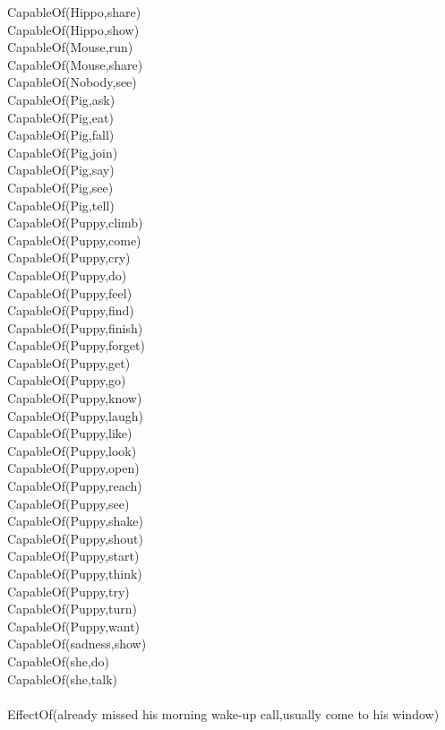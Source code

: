 \begin{multicols}{2}
\begin{footnotesize}
CapableOf(Hippo,share) \\
CapableOf(Hippo,show) \\
CapableOf(Mouse,run) \\
CapableOf(Mouse,share) \\
CapableOf(Nobody,see) \\
CapableOf(Pig,ask) \\
CapableOf(Pig,eat) \\
CapableOf(Pig,fall) \\
CapableOf(Pig,join) \\
CapableOf(Pig,say) \\
CapableOf(Pig,see) \\
CapableOf(Pig,tell) \\
CapableOf(Puppy,climb) \\
CapableOf(Puppy,come) \\
CapableOf(Puppy,cry) \\
CapableOf(Puppy,do) \\
CapableOf(Puppy,feel) \\
CapableOf(Puppy,find) \\
CapableOf(Puppy,finish) \\
CapableOf(Puppy,forget) \\
CapableOf(Puppy,get) \\
CapableOf(Puppy,go) \\
CapableOf(Puppy,know) \\
CapableOf(Puppy,laugh) \\
CapableOf(Puppy,like) \\
CapableOf(Puppy,look) \\
CapableOf(Puppy,open) \\
CapableOf(Puppy,reach) \\
CapableOf(Puppy,see) \\
CapableOf(Puppy,shake) \\
CapableOf(Puppy,shout) \\
CapableOf(Puppy,start) \\
CapableOf(Puppy,think) \\
CapableOf(Puppy,try) \\
CapableOf(Puppy,turn) \\
CapableOf(Puppy,want) \\
CapableOf(sadness,show) \\
CapableOf(she,do) \\
CapableOf(she,talk) \\
~\\
EffectOf(already missed his morning wake-up call,usually come to his window) \\

\end{footnotesize}
\end{multicols}
